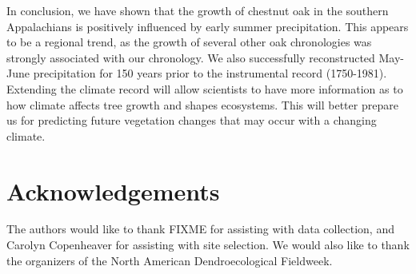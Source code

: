 In conclusion, we have shown that the growth of chestnut oak in
the southern Appalachians is positively influenced by early summer
precipitation. This appears to be a regional trend, as the growth
of several other oak chronologies was strongly associated with our
chronology. We also successfully reconstructed May-June precipitation
for 150 years prior to the instrumental record (1750-1981). Extending
the climate record will allow scientists to have more information as to
how climate affects tree growth and shapes ecosystems. This will better
prepare us for predicting future vegetation changes that may occur with
a changing climate.

\section{Acknowledgements} The authors would like to thank FIXME for
assisting with data collection, and Carolyn Copenheaver for assisting
with site selection. We would also like to thank the organizers of the
North American Dendroecological Fieldweek.

